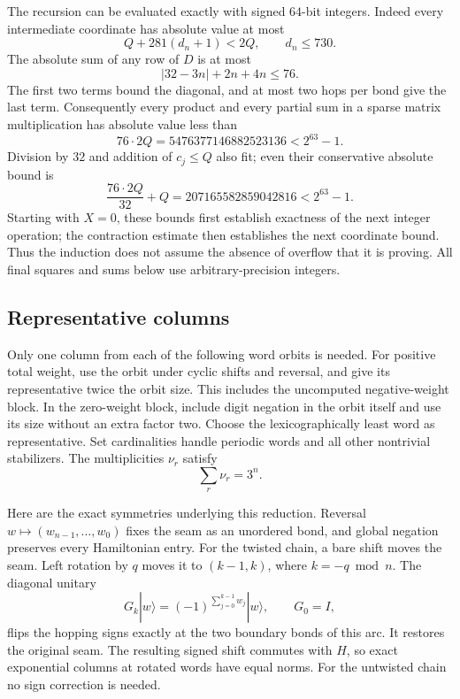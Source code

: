 The recursion can be evaluated exactly with signed \(64\)-bit integers.
Indeed every intermediate coordinate has absolute value at most
\[
 Q+281(d_n+1)<2Q,\qquad d_n\le730.
\]
The absolute sum of any row of \(D\) is at most
\[
 |32-3n|+2n+4n\le76.
\]
The first two terms bound the diagonal, and at most two hops per bond
give the last term. Consequently every product and every partial sum in
a sparse matrix multiplication has absolute value less than
\[
 76\cdot2Q=5476377146882523136<2^{63}-1.
\]
Division by \(32\) and addition of \(c_j\le Q\) also fit; even their
conservative absolute bound is
\[
 \frac{76\cdot2Q}{32}+Q=207165582859042816<2^{63}-1.
\]
Starting with \(X=0\), these bounds first establish exactness of the next
integer operation; the contraction estimate then establishes the next
coordinate bound. Thus the induction does not assume the absence of
overflow that it is proving. All final squares and sums below use
arbitrary-precision integers.

\subsection{Representative columns}

Only one column from each of the following word orbits is needed.
For positive total weight, use the orbit under cyclic shifts and
reversal, and give its representative twice the orbit size. This
includes the uncomputed negative-weight block. In the zero-weight
block, include digit negation in the orbit itself and use its size
without an extra factor two. Choose the lexicographically least word
as representative. Set cardinalities handle periodic words and all
other nontrivial stabilizers. The multiplicities \(\nu_r\) satisfy
\[
 \sum_r\nu_r=3^n.
\]

Here are the exact symmetries underlying this reduction. Reversal
\(w\mapsto(w_{n-1},\ldots,w_0)\) fixes the seam as an unordered bond, and global
negation preserves every Hamiltonian entry. For the twisted chain,
a bare shift moves the seam. Left rotation by \(q\) moves it to
\((k-1,k)\), where \(k=-q\bmod n\). The diagonal unitary
\[
 G_k|w\rangle=(-1)^{\sum_{j=0}^{k-1}w_j}|w\rangle,\qquad G_0=I,
\]
flips the hopping signs exactly at the two boundary bonds of this arc.
It restores the original seam. The resulting signed shift commutes with
\(H\), so exact exponential columns at rotated words have equal norms.
For the untwisted chain no sign correction is needed.

